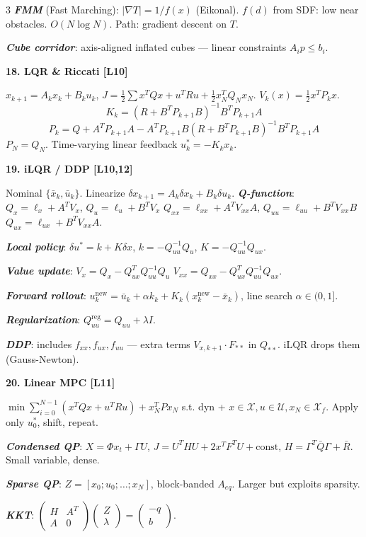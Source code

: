 \documentclass[8pt,a4paper,landscape]{extarticle}
\newcommand{\sect}[1]{\vspace{1pt}\colorbox{black!10}{\parbox{\linewidth}{\textbf{\footnotesize #1}}}\vspace{1pt}}
\newcommand{\sub}[1]{\textbf{\textit{#1}}}
\begin{document}
\begin{multicols*}{3}
\sub{FMM} (Fast Marching): $|\nabla T|=1/f(x)$ (Eikonal). $f(d)$ from SDF: low near obstacles. $O(N\log N)$. Path: gradient descent on $T$.

\sub{Cube corridor}: axis-aligned inflated cubes — linear constraints $A_i p\le b_i$.

\sect{18. LQR \& Riccati \hfill {\scriptsize[L10]}}
$x_{k+1}=A_k x_k+B_k u_k$, $J=\tfrac12\sum x^T Q x+u^T R u + \tfrac12 x_N^T Q_N x_N$.
$V_k(x)=\tfrac12 x^T P_k x$.
\[K_k=(R+B^T P_{k+1}B)^{-1}B^T P_{k+1}A\]
\[P_k=Q+A^T P_{k+1}A-A^T P_{k+1}B(R+B^T P_{k+1}B)^{-1}B^T P_{k+1}A\]
$P_N=Q_N$. Time-varying linear feedback $u_k^*=-K_k x_k$.

\sect{19. iLQR / DDP \hfill {\scriptsize[L10,12]}}
Nominal $\{\bar x_k,\bar u_k\}$. Linearize $\delta x_{k+1}=A_k\delta x_k+B_k\delta u_k$.
\sub{Q-function}:
$Q_x=\ell_x+A^T V_x$, $Q_u=\ell_u+B^T V_x$
$Q_{xx}=\ell_{xx}+A^T V_{xx}A$, $Q_{uu}=\ell_{uu}+B^T V_{xx}B$
$Q_{ux}=\ell_{ux}+B^T V_{xx}A$.

\sub{Local policy}: $\delta u^*=k+K\delta x$, $k=-Q_{uu}^{-1}Q_u$, $K=-Q_{uu}^{-1}Q_{ux}$.

\sub{Value update}:
$V_x=Q_x-Q_{ux}^T Q_{uu}^{-1}Q_u$
$V_{xx}=Q_{xx}-Q_{ux}^T Q_{uu}^{-1}Q_{ux}$.

\sub{Forward rollout}: $u_k^{\text{new}}=\bar u_k+\alpha k_k+K_k(x_k^{\text{new}}-\bar x_k)$, line search $\alpha\in(0,1]$.

\sub{Regularization}: $Q_{uu}^{\text{reg}}=Q_{uu}+\lambda I$.

\sub{DDP}: includes $f_{xx},f_{ux},f_{uu}$ — extra terms $V_{x,k+1}\cdot F_{**}$ in $Q_{**}$. iLQR drops them (Gauss-Newton).

\sect{20. Linear MPC \hfill {\scriptsize[L11]}}
$\min\sum_{i=0}^{N-1}(x^T Q x+u^T R u)+x_N^T P x_N$ s.t. dyn + $x\in\mathcal X, u\in\mathcal U, x_N\in\mathcal X_f$. Apply only $u_0^*$, shift, repeat.

\sub{Condensed QP}: $X=\Phi x_t+\Gamma U$, $J=U^T HU+2x^T F^T U+\text{const}$, $H=\Gamma^T\bar Q\Gamma+\bar R$. Small variable, dense.

\sub{Sparse QP}: $Z=[x_0;u_0;\dots;x_N]$, block-banded $A_{eq}$. Larger but exploits sparsity.

\sub{KKT}: $\begin{pmatrix}H&A^T\\A&0\end{pmatrix}\begin{pmatrix}Z\\\lambda\end{pmatrix}=\begin{pmatrix}-q\\b\end{pmatrix}$.


\end{multicols*}
\end{document}
